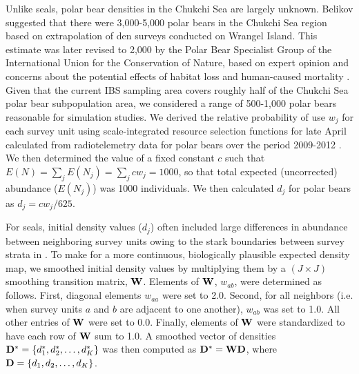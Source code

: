 \documentclass[]{rsos}%
\begin{document}
{Unlike seals, polar bear densities in the Chukchi Sea are largely unknown. Belikov \cite{Belikov1992} suggested that there were 3,000-5,000 polar bears in the Chukchi Sea region based on extrapolation of den surveys conducted on Wrangel Island. This estimate was later revised to 2,000 by the Polar Bear Specialist Group of the International Union for the Conservation of Nature, based on expert opinion and concerns about the potential effects of habitat loss and human-caused mortality \cite{AarsEtAl2006}. Given that the current IBS sampling area covers roughly half of the Chukchi Sea polar bear subpopulation area, we considered a range of 500-1,000 polar bears reasonable for simulation studies. We derived the relative probability of use $w_j$ for each survey unit using scale-integrated resource selection functions for late April calculated from radiotelemetry data for polar bears over the period 2009-2012 \cite{WilsonEtAl2014}.
We then determined the value of a fixed constant $c$ such that $E(N) = \sum_j E(N_j) = \sum_j c w_j = 1000$,  so that total expected (uncorrected) abundance ($E(N_j)$) was 1000 individuals.  We then calculated $d_j$ for polar bears as $d_j = c w_j /625$.

For seals, initial density values ($d_j$) often included large differences in abundance between neighboring survey units owing to the stark boundaries between survey strata in \cite{Bengtson2005}.  To make for a more continuous, biologically plausible expected density map, we smoothed initial density values by multiplying them by a $(J \times J)$ smoothing transition matrix, ${\bf W}$.  Elements of ${\bf W}$, $w_{ab}$, were determined as follows.  First, diagonal elements $w_{aa}$ were set to 2.0.  Second, for all neighbors (i.e. when survey units $a$ and $b$ are adjacent to one another), $w_{ab}$ was set to 1.0.  All other entries of ${\bf W}$ were set to 0.0.  Finally, elements of ${\bf W}$ were standardized to have each row of ${\bf W}$ sum to 1.0.  A smoothed vector of densities ${\bf D}^* = \{ d_1^*, d_2^*, \hdots, d_K^* \}$ was then computed as ${\bf D}^*={\bf W}{\bf D}$, where ${\bf D} = \{ d_1, d_2, \hdots, d_K \}$.

}
\end{document}
